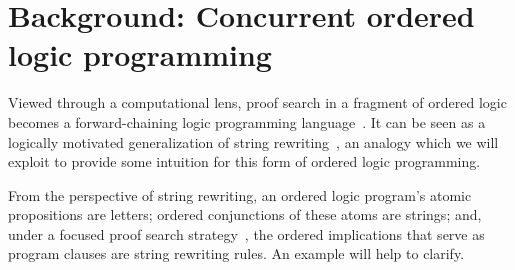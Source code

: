\documentclass[
  class=../hdeyoung-proposal,
  crop=false
]{standalone}
\begin{document}
\section{Background: Concurrent ordered logic programming}\label{sec:ordered-lp}



Viewed through a computational lens, proof search in a fragment of ordered logic becomes a forward-chaining logic programming language~\autocite{Pfenning+Simmons:LICS09}.
It %
can be seen as a logically motivated generalization of string rewriting~\autocite[see, \eg,][]{Book+Otto:SRS93}, an analogy which we will exploit to provide some intuition for this form of ordered logic programming.

From the perspective of string rewriting, an ordered logic program's atomic propositions are letters; ordered conjunctions of these atoms are strings; and, under a focused proof search strategy~\autocite{Andreoli:JLC92}, the ordered implications that serve as program clauses are string rewriting rules.
An example will help to clarify.





\end{document}
